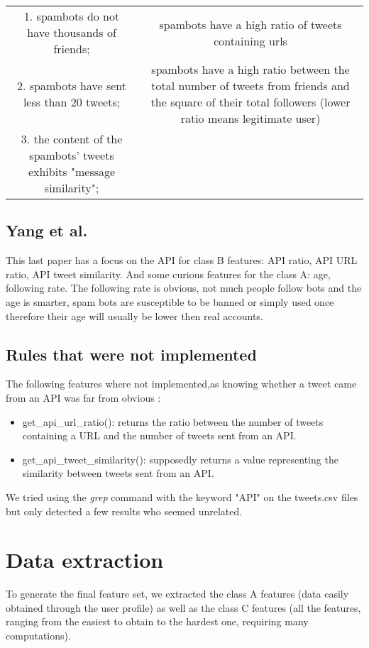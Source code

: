 \documentclass[a4paper,11pt]{article}
\begin{document}
\begin{tabular}{cc}
\hline
1. spambots do not have thousands of friends; & spambots have a high ratio of tweets containing urls\\
2. spambots have sent less than 20 tweets; & spambots have a high ratio between the total number of tweets from friends and the square of their total followers (lower ratio means legitimate user)\\
3. the content of the spambots' tweets exhibits "message similarity"; & \\
\hline
\end{tabular}


\subsection{Yang et al.}
This last paper has a focus on the API for class B features: API ratio, API URL ratio, API tweet similarity. And some curious features for the class A: age, following rate. The following rate is obvious, not much people follow bots and the age is smarter, spam bots are susceptible to be banned or simply used once therefore their age will usually be lower then real accounts.

\subsection{Rules that were not implemented}
The following features where not implemented,as knowing whether a tweet came from an API was far from obvious : \\

\begin{itemize}
\item{get\_api\_url\_ratio(): returns the ratio between the number of tweets containing a URL and the number of tweets sent from an API.}
\item{get\_api\_tweet\_similarity(): supposedly returns a value representing the similarity between tweets sent from an API.}
\end{itemize} 

We tried using the \textit{grep} command with the keyword "API" on the tweets.csv files but only detected a few results who seemed unrelated.

\section{Data extraction}
To generate the final feature set, we extracted the class A features (data easily obtained through the user profile) as well as the class C features (all the features, ranging from the easiest to obtain to the hardest one, requiring many computations).\\
\end{document}
